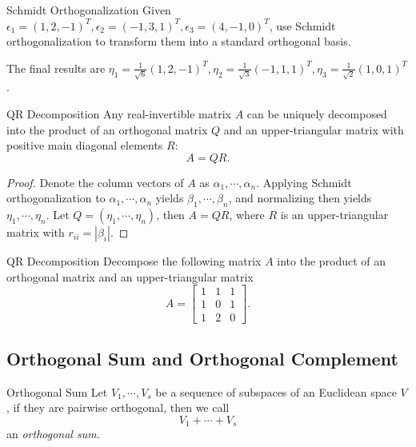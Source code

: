 \begin{example}{Schmidt Orthogonalization}{}
  Given $\epsilon_1 = (1, 2, -1)^T, \epsilon_2 = (-1,3,1)^T, \epsilon_3 =
  (4,-1,0)^T$,
  use Schmidt orthogonalization to transform them into a standard orthogonal basis.
\end{example}

\begin{solution}
  The final results are $\eta_{1}=\frac{1}{\sqrt{6}}(1,2,-1)^{T},\eta_{2}=\frac{1}{\sqrt{3}}(-1,1,1)^{T},\eta_{3}=\frac{1}{\sqrt{2}}(1,0,1)^{T}$.
\end{solution}

\begin{theorem}{QR Decomposition}{}
  Any real-invertible matrix $A$ can be uniquely decomposed into the product of an
  orthogonal matrix $Q$ and an upper-triangular matrix with positive main
  diagonal elements $R$:
  \begin{equation}
    A = QR.
  \end{equation}
\end{theorem}

\begin{proof}
  Denote the column vectors of $A$ as $\alpha_1,\cdots,\alpha_n$.
  Applying Schmidt orthogonalization to $\alpha_1,\cdots,\alpha_n$ yields
  $\beta_1,\cdots,\beta_n$, and normalizing then yields $\eta_1,\cdots,\eta_n$.
  Let $Q = (\eta_1,\cdots,\eta_n)$, then $A = QR$,
  where $R$ is an upper-triangular matrix with $r_{ii} = |\beta_i|$.
\end{proof}

\begin{example}{QR Decomposition}{}
  Decompose the following matrix $A$ into the product of an orthogonal matrix
  and an upper-triangular matrix
  \begin{equation}
    A =
    \begin{bmatrix}
      1 & 1 & 1\\
      1 & 0 & 1\\
      1 & 2 & 0
    \end{bmatrix}.
  \end{equation}
\end{example}

\subsection{Orthogonal Sum and Orthogonal Complement}

\begin{definition}{Orthogonal Sum}{}
  Let $V_1, \cdots, V_s$ be a sequence of subspaces of an Euclidean space $V$,
  if they are pairwise orthogonal, then we call
  \begin{equation}
    V_1 + \cdots + V_s
  \end{equation}
  an \emph{orthogonal sum}.
\end{definition}

